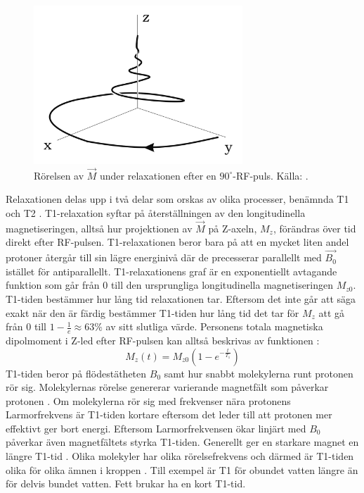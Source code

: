 \documentclass[11pt, a4paper]{article}
\begin{document}
\begin{figure}[ht]
	\centering
	\includegraphics[width=0.7\textwidth]{relaxation}
	\caption{Rörelsen av $\vec{M}$ under relaxationen efter en $90^\circ$-RF-puls. Källa: \cite{mri_lärobok}.}
	\label{fig:relaxation}
\end{figure}

Relaxationen delas upp i två delar som orskas av olika processer, benämnda T1 och T2 \parencite{understanding_mri}. T1-relaxation syftar på återställningen av den longitudinella magnetiseringen, alltså hur projektionen av $\vec{M}$ på Z-axeln, $M_z$, förändras över tid direkt efter RF-pulsen. T1-relaxationen beror bara på att en mycket liten andel protoner återgår till sin lägre energinivå där de precesserar parallellt med $\vec{B_0}$ istället för antiparallellt. T1-relaxationens graf är en exponentiellt avtagande funktion som går från $0$ till den ursprungliga longitudinella magnetiseringen $M_{z0}$. T1-tiden bestämmer hur lång tid relaxationen tar. Eftersom det inte går att säga exakt när den är färdig bestämmer T1-tiden hur lång tid det tar för $M_z$ att gå från 0 till $1-\frac{1}{e}\approx63\%$ av sitt slutliga värde. Personens totala magnetiska dipolmoment i Z-led efter RF-pulsen kan alltså beskrivas av funktionen \parencite{t1_relaxation}: 
\begin{equation}
	M_z(t)=M_{z0}(1-e^{-\frac{t}{T_1}})	
\end{equation}
T1-tiden beror på flödestätheten $B_0$ samt hur snabbt molekylerna runt protonen rör sig. Molekylernas rörelse genererar varierande magnetfält som påverkar protonen \parencite{understanding_mri}. Om molekylerna rör sig med frekvenser nära protonens Larmorfrekvens är T1-tiden kortare eftersom det leder till att protonen mer effektivt ger bort energi. Eftersom Larmorfrekvensen ökar linjärt med $B_0$ påverkar även magnetfältets styrka T1-tiden. Generellt ger en starkare magnet en längre T1-tid \parencite{t1_relaxation}. Olika molekyler har olika rörelsefrekvens och därmed är T1-tiden olika för olika ämnen i kroppen \parencite{understanding_mri}. Till exempel är T1 för obundet vatten längre än för delvis bundet vatten. Fett brukar ha en kort T1-tid.
\end{document}
